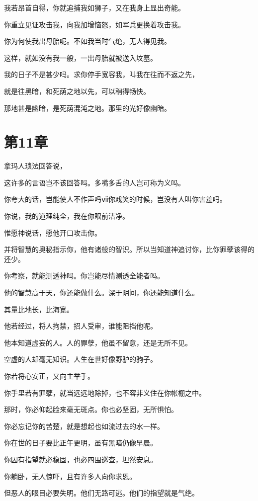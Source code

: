 \documentclass[12pt,oneside]{book}
\begin{document}
我若昂首自得，你就追捕我如狮子，又在我身上显出奇能。

你重立见证攻击我，向我加增恼怒，如军兵更换着攻击我。

你为何使我出母胎呢。不如我当时气绝，无人得见我。

这样，就如没有我一般，一出母胎就被送入坟墓。

我的日子不是甚少吗。求你停手宽容我，叫我在往而不返之先，

就是往黑暗，和死荫之地以先，可以稍得畅快。

那地甚是幽暗，是死荫混沌之地。那里的光好像幽暗。



\chapter{第11章}
拿玛人琐法回答说，

这许多的言语岂不该回答吗。多嘴多舌的人岂可称为义吗。

你夸大的话，岂能使人不作声吗ⅶ你戏笑的时候，岂没有人叫你害羞吗。

你说，我的道理纯全，我在你眼前洁净。

惟愿神说话，愿他开口攻击你。

并将智慧的奥秘指示你，他有诸般的智识。所以当知道神追讨你，比你罪孽该得的还少。

你考察，就能测透神吗。你岂能尽情测透全能者吗。

他的智慧高于天，你还能做什么。深于阴间，你还能知道什么。

其量比地长，比海宽。

他若经过，将人拘禁，招人受审，谁能阻挡他呢。

他本知道虚妄的人。人的罪孽，他虽不留意，还是无所不见。

空虚的人却毫无知识。人生在世好像野驴的驹子。

你若将心安正，又向主举手。

你手里若有罪孽，就当远远地除掉，也不容非义住在你帐棚之中。

那时，你必仰起脸来毫无斑点。你也必坚固，无所惧怕。

你必忘记你的苦楚，就是想起也如流过去的水一样。

你在世的日子要比正午更明，虽有黑暗仍像早晨。

你因有指望就必稳固，也必四围巡查，坦然安息。

你躺卧，无人惊吓，且有许多人向你求恩。

但恶人的眼目必要失明。他们无路可逃。他们的指望就是气绝。
\end{document}
